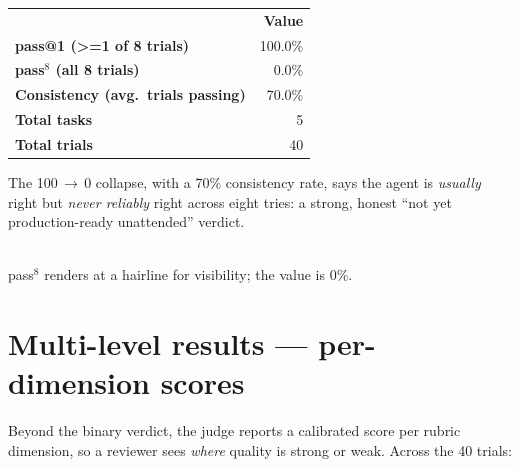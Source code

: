 \documentclass[11pt]{article}
\begin{document}
\begin{minipage}[t]{0.5\textwidth}
\vspace{0pt}
\begin{tabular}{@{}>{\bfseries}p{4.6cm} r@{}}
\toprule
\rowcolor{headerbg}\multicolumn{1}{@{}>{\bfseries\color{white}}l}{Metric} & \color{white}\bfseries Value \\
pass@1 \;(\textgreater=1 of 8 trials) & 100.0\% \\
pass$^{8}$ \;(all 8 trials) & 0.0\% \\
Consistency \;(avg.\ trials passing) & 70.0\% \\
Total tasks & 5 \\
Total trials & 40 \\
\bottomrule
\end{tabular}
\vspace{6pt}

{\small The 100\,$\rightarrow$\,0 collapse, with a 70\% consistency rate, says the agent is
\emph{usually} right but \emph{never reliably} right across eight tries: a strong, honest
``not yet production-ready unattended'' verdict.}
\end{minipage}\hfill
\begin{minipage}[t]{0.47\textwidth}
\vspace{0pt}
\centering
{}\\[-2pt]
{\scriptsize\color{muted}pass$^{8}$ renders at a hairline for visibility; the value is 0\%.}
\end{minipage}

\section{Multi-level results --- per-dimension scores}
Beyond the binary verdict, the judge reports a calibrated score per rubric dimension, so a
reviewer sees \emph{where} quality is strong or weak. Across the 40 trials:
\end{document}
